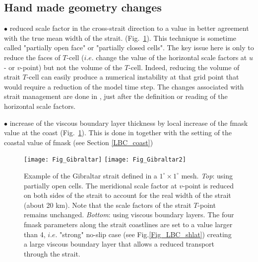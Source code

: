 \documentclass[NEMO_book]{subfiles}
\begin{document}
\subsection{Hand made geometry changes}
\label{MISC_strait_hand}

$\bullet$ reduced scale factor in the cross-strait direction to a value in better agreement 
with the true mean width of the strait. (Fig.~\ref{Fig_MISC_strait_hand}).
This technique is sometime called "partially open face" or "partially closed cells".
The key issue here is only to reduce the faces of $T$-cell ($i.e.$ change the value 
of the horizontal scale factors at $u$- or $v$-point) but not the volume of the $T$-cell.
Indeed, reducing the volume of strait $T$-cell can easily produce a numerical 
instability at that grid point that would require a reduction of the model time step.
The changes associated with strait management are done in , 
just after the definition or reading of the horizontal scale factors. 

$\bullet$ increase of the viscous boundary layer thickness by local increase of the 
fmask value at the coast (Fig.~\ref{Fig_MISC_strait_hand}). This is done in 
 together with the setting of the coastal value of fmask 
(see Section \ref{LBC_coast})

\begin{figure}[!tbp] 	 \begin{center}
\texttt{[image: Fig\_Gibraltar]}
\texttt{[image: Fig\_Gibraltar2]}
\caption{	\label{Fig_MISC_strait_hand} 
Example of the Gibraltar strait defined in a $1^{\circ} \times 1^{\circ}$ mesh. 
\textit{Top}: using partially open cells. The meridional scale factor at $v$-point 
is reduced on both sides of the strait to account for the real width of the strait 
(about 20 km). Note that the scale factors of the strait $T$-point remains unchanged. 
\textit{Bottom}: using viscous boundary layers. The four fmask parameters 
along the strait coastlines are set to a value larger than 4, $i.e.$ "strong" no-slip 
case (see Fig.\ref{Fig_LBC_shlat}) creating a large viscous boundary layer 
that allows a reduced transport through the strait.}
\end{center}   \end{figure}
\end{document}
